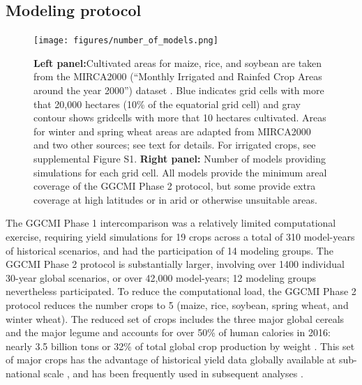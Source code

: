 \documentclass[gmd, manuscript]{copernicus} %
\begin{document}
\subsection{Modeling protocol}
\begin{figure}[ht]
  \centering
  \texttt{[image: figures/number\_of\_models.png]}
  \caption{
  \textbf{Left panel:}Cultivated areas for maize, rice, and soybean are taken from the MIRCA2000 (``Monthly Irrigated and Rainfed Crop Areas around the year 2000'') dataset \citep{Portmann2010}. Blue indicates grid cells with more that 20,000 hectares (10\% of the equatorial grid cell) and gray contour shows gridcells with more that 10 hectares cultivated. 
  Areas for winter and spring wheat areas are adapted from MIRCA2000 and two other sources; see text for details.  For irrigated crops, see supplemental Figure S1.
  \textbf{Right panel:} Number of models providing simulations for each grid cell.  
  All models provide the minimum areal coverage of the GGCMI Phase 2 protocol, but some provide extra coverage at high latitudes or in arid or otherwise unsuitable areas.}
  \label{fig:crop_area}
\end{figure}

The GGCMI Phase 1 intercomparison was a relatively limited computational exercise, requiring yield simulations for 19 crops across a total of 310 model-years of historical scenarios, and had the participation of 14 modeling groups.
The GGCMI Phase 2 protocol is substantially larger, involving over 1400 individual 30-year global scenarios, or over 42,000 model-years; 12 modeling groups nevertheless participated. To reduce the computational load, the GGCMI Phase 2 protocol reduces the number crops to 5 (maize, rice, soybean, spring wheat, and winter wheat). 
The reduced set of crops includes the three major global cereals and the major legume and accounts for over 50\% of human calories in 2016: nearly 3.5 billion tons or 32\% of total global crop production by weight \citep{FAOSTAT}. 
This set of major crops has the advantage of historical yield data globally available at sub-national scale \citep{Ray2012,iizumi_historical_2014}, and has been frequently used in subsequent analyses \citep[e.g.][]{muller_global_2017,porwollik_spatial_2016}.
\end{document}
